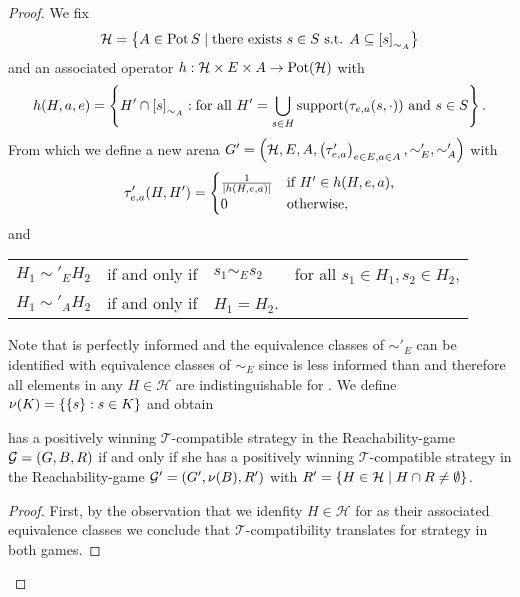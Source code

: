 \begin{proof}
  We fix 
  \begin{equation*}
    \mathcal{H} = \left\{
      A\in\operatorname{Pot}{S}\mid\text{there exists }s\in S\text{ s.t. }
       A\subseteq\left[s\right]_{\sim_{A}}
    \right\}
  \end{equation*}
  and an associated operator
  $h: \mathcal{H}\times E\times A\rightarrow\operatorname{Pot}(\mathcal{H})$
  with 
  \begin{equation*}
    h(H, a, e) = \left\{
      H'\cap\left[s\right]_{\sim_{A}}:\text{for all }H' = 
        \bigcup_{s\in H}\operatorname{support}(\tau_{e,a}(s, \cdot))\text{ and }s\in S
    \right\}.
  \end{equation*}
  From which we define a new arena $G' = \left(\mathcal{H}, E, A, 
  \left(\tau'_{e,a}\right)_{e\in E,a\in A}, \sim'_{E}, \sim'_{A}\right)$ with
  \begin{equation*}
    \tau'_{e,a}(H, H') = \begin{cases}
      \frac{1}{\left\vert{h(H, e, a)}\right\vert}&\text{if }H'\in h(H, e, a),\\
      0&\text{otherwise},
    \end{cases}
  \end{equation*}
  and
  \begin{center}
    \begin{tabular}{llll}
      $H_{1}\sim'_{E} H_{2}$ & if and only if & $s_{1}\sim_{E} s_{2}$ & 
        for all $s_{1}\in H_{1}, s_{2}\in H_{2}$,\\
      $H_{1}\sim'_{A} H_{2}$ & if and only if & $H_{1} = H_{2}$. & \\
    \end{tabular}
  \end{center}
  Note that \adam{} is perfectly informed and the equivalence classes of 
  $\sim'_{E}$ can be identified with equivalence classes of $\sim_{E}$ 
  since \eve{} is less informed than \adam{} and therefore all elements in any
  $H\in\mathcal{H}$ are indistinguishable for \eve{}. We define 
  $\nu(K) = \left\{\left\{s\right\}:s\in K\right\}$ and obtain
  \begin{proposition}
    \eve{} has a positively winning $\mathcal{T}$-compatible strategy in the 
    Reachability-game $\mathcal{G} = \left(G, B, R\right)$ if and only if she has a 
    positively winning $\mathcal{T}$-compatible strategy in the 
    Reachability-game $\mathcal{G'} = \left(G', \nu(B), R'\right)$ with 
    $R' = \left\{H\in\mathcal{H}\mid H\cap R\neq\emptyset\right\}$.
  \end{proposition}
  \begin{proof}
    First, by the observation that we idenfity $H\in\mathcal{H}$ for \eve{} as
    their associated equivalence classes we conclude that 
    $\mathcal{T}$-compatibility translates for strategy in both games.


\end{proof}
\end{proof}
